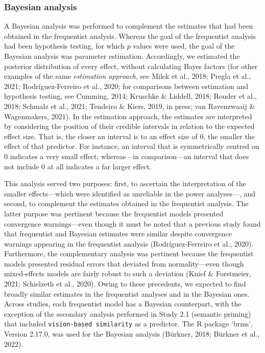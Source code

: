 \documentclass[
  12pt,
  man,floatsintext]{apa7}
\begin{document}
\hypertarget{bayesian-analysis}{%
\subsubsection{Bayesian analysis}\label{bayesian-analysis}}

A Bayesian analysis was performed to complement the estimates that had been obtained in the frequentist analysis. Whereas the goal of the frequentist analysis had been hypothesis testing, for which \(p\) values were used, the goal of the Bayesian analysis was parameter estimation. Accordingly, we estimated the posterior distribution of every effect, without calculating Bayes factors (for other examples of the same \emph{estimation approach}, see Milek et al., 2018; Pregla et al., 2021; Rodríguez-Ferreiro et al., 2020; for comparisons between estimation and hypothesis testing, see Cumming, 2014; Kruschke \& Liddell, 2018; Rouder et al., 2018; Schmalz et al., 2021; Tendeiro \& Kiers, 2019, in press; van Ravenzwaaij \& Wagenmakers, 2021). In the estimation approach, the estimates are interpreted by considering the position of their credible intervals in relation to the expected effect size. That is, the closer an interval is to an effect size of 0, the smaller the effect of that predictor. For instance, an interval that is symmetrically centred on 0 indicates a very small effect, whereas---in comparison---an interval that does not include 0 at all indicates a far larger effect.

This analysis served two purposes: first, to ascertain the interpretation of the smaller effects---which were identified as unreliable in the power analyses---, and second, to complement the estimates obtained in the frequentist analysis. The latter purpose was pertinent because the frequentist models presented convergence warnings---even though it must be noted that a previous study found that frequentist and Bayesian estimates were similar despite convergence warnings appearing in the frequentist analysis (Rodríguez-Ferreiro et al., 2020). Furthermore, the complementary analysis was pertinent because the frequentist models presented residual errors that deviated from normality---even though mixed-effects models are fairly robust to such a deviation (Knief \& Forstmeier, 2021; Schielzeth et al., 2020). Owing to these precedents, we expected to find broadly similar estimates in the frequentist analyses and in the Bayesian ones. Across studies, each frequentist model has a Bayesian counterpart, with the exception of the secondary analysis performed in Study 2.1 (semantic priming) that included \texttt{vision-based\ similarity} as a predictor. The R package `brms', Version 2.17.0, was used for the Bayesian analysis (Bürkner, 2018; Bürkner et al., 2022).
\end{document}
